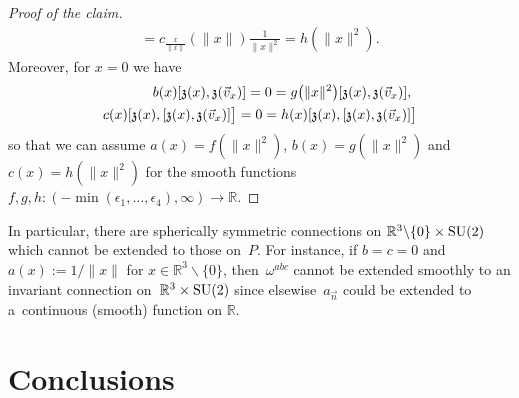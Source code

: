 \documentclass[pdftex]{sigma}
\numberwithin{equation}{section}
\begin{document}
\begin{Example}
\begin{proof}[Proof of the claim]
\begin{gather*}
=c_{\textstyle\frac{x}{\|x\|}}\left(\|x\|\right)\frac{1}{\|x\|^2} =h\left(\|x\|^2\right).
\end{gather*}
Moreover, for $x=0$ we have
\begin{gather*}
\hspace{31.5pt}b(x)[{\mathfrak{z}}(x),{\mathfrak{z}}(\vec{v}_x)]=0=g\big(\|x\|^2\big)[{\mathfrak{z}}(x),{\mathfrak{z}}(\vec{v}_x)],
\\
c(x)[{\mathfrak{z}}(x),[{\mathfrak{z}}(x),{\mathfrak{z}}(\vec{v}_x)]\big]=0=h(x)[{\mathfrak{z}}(x),[{\mathfrak{z}}(x),{\mathfrak{z}}(\vec{v}_x)]\big]
\end{gather*}
so that we can assume $a(x)=f(\|x\|^2)$, $b(x)=g(\|x\|^2)$ and $c(x)=h(\|x\|^2)$ for the smooth functions $f,g,h\colon
\left(-\min(\epsilon_1,\dots,\epsilon_4),\infty\right)\rightarrow \mathbb{R}$.
\end{proof}

In particular, there are spherically symmetric connections on $\mathbb{R}^3\backslash \{0\}\times {\rm SU}(2)$
which cannot be extended to those on~$P$.
For instance, if $b=c=0$ and $a(x):=1\slash \|x\|$ for $x\in \mathbb{R}^3\backslash \{0\}$, then~$\omega^{abc}$ cannot
be extended smoothly to an invariant connection on~$\mathbb{R}^3\times {\rm SU}(2)$ since elsewise~$a_{\vec{n}}$ could be
extended to a~continuous (smooth) function on $\mathbb{R}$.
\end{Example}

\section{Conclusions}
\end{document}
